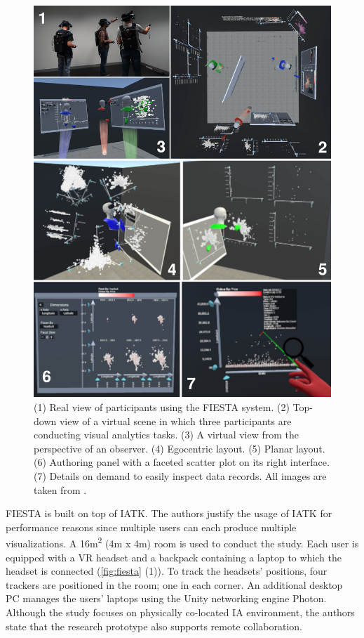 \documentclass{vgtc}                          %
\begin{document}
\begin{figure}[tb]
	\centering
	\includegraphics[width=\columnwidth]{fiesta}
	\caption{(1) Real view of participants using the FIESTA system. (2)
		Top-down view of a virtual scene in which three participants are
		conducting visual analytics tasks. (3) A virtual view from the perspective of an
		observer. (4) Egocentric layout. (5) Planar layout. (6) Authoring panel
		with a faceted scatter plot on its right interface. (7) Details on
		demand to easily inspect data records. All images are taken from
		\cite{fiesta_prototype}.}
	\label{fig:fiesta}
\end{figure}

\noindent FIESTA is built on top of IATK. The authors justify the usage of IATK
for performance reasons since multiple users can each produce multiple
visualizations. A 16m\textsuperscript{2} (4m x 4m) room is used to conduct the
study. Each user is equipped with a VR headset and a backpack containing a
laptop to which the headset is connected (\autoref{fig:fiesta} (1)). To track the
headsets' positions, four trackers are positioned in the room; one in each
corner. An additional desktop PC manages the users' laptops using the Unity
networking engine Photon. Although the study focuses on physically co-located
IA environment, the authors state that the research prototype also supports
remote collaboration.
\end{document}
